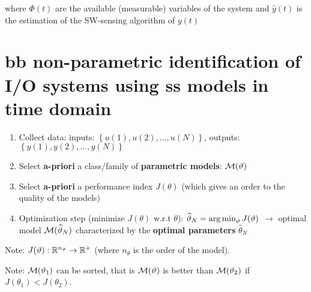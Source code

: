 where $\Phi(t)$ are the available (measurable) variables of the system and $\hat{y}(t)$ is the estimation of the SW-sensing algorithm of $y(t)$

\chapter{\acrlong{bb} non-parametric identification of I/O systems using \acrlong{ss} models in time domain}

\vspace{-12pt}
\begin{figure}[H]
    \centering
\end{figure}


\begin{recall}
\hfill \break
    \begin{enumerate}
        \item Collect data: inputs: $\left\{u(1), u(2), \ldots, u(N)\right\}$, outputs: $\left\{y(1), y(2), \ldots, y(N)\right\}$
        \item Select \textbf{a-priori} a class/family of \textbf{parametric models}: $\mathcal{M}(\vartheta)$
        \item Select \textbf{a-priori} a performance index $J(\theta)$ (which gives an order to the quality of the models)
        \item Optimization step (minimize $J(\theta)$ w.r.t $\theta$): $\widehat{\vartheta}_N = \operatorname*{arg\,min}_\vartheta J(\vartheta)$ $\rightarrow$ optimal model $\mathcal{M}(\widehat{\vartheta}_N)$ characterized by the \textbf{optimal parameters} $\hat{\theta}_N$
    \end{enumerate}
    
    Note:    $J(\vartheta): \mathbb{R}^{n_\vartheta} \rightarrow \mathbb{R}^+$ (where $n_\theta$ is the order of the model).
    
    Note: $\mathcal{M}(\vartheta_1)$ can be sorted, that is $\mathcal{M}(\vartheta)$ is better than $\mathcal{M}(\vartheta_2)$ if $J(\theta_1) < J(\theta_2)$.

\end{recall}

